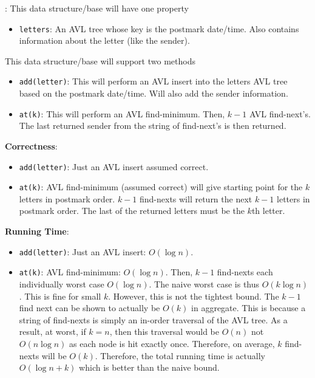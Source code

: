 \documentclass[12pt,twoside]{article}
\begin{document}
\begin{problems}
\begin{problemparts}
: This data structure/base will have one property
    \begin{itemize}
        \item {\tt letters}: An AVL tree whose key is the postmark date/time.
        Also contains information about the letter (like the sender).
    \end{itemize}
    This data structure/base will support two methods
    \begin{itemize}
        \item {\tt add(letter)}: This will perform an AVL insert into the
        letters AVL tree based on the postmark date/time. Will also add the
        sender information.
        \item {\tt at(k)}: This will perform an AVL find-minimum. Then, $k -
        1$ AVL find-next's. The last returned sender from the string of
        find-next's is then returned.
    \end{itemize}

    \smallbreak

    {\bf Correctness}: \begin{itemize}
        \item {\tt add(letter)}: Just an AVL insert assumed correct.
        \item {\tt at(k)}: AVL find-minimum (assumed correct) will give
        starting point for the $ k $ letters in postmark order. $ k - 1 $
        find-nexts will return the next $ k - 1 $ letters in postmark order.
        The last of the returned letters must be the $ k $th letter.
    \end{itemize}

    \smallbreak

    {\bf Running Time}: \begin{itemize}
        \item {\tt add(letter)}: Just an AVL insert: $ O(\log n) $.
        \item {\tt at(k)}: AVL find-minimum: $ O(\log n) $. Then, $ k - 1 $
        find-nexts each individually worst case $ O(\log n) $. The naive
        worst case is thus $ O(k \log n) $. This is fine for small $ k $.
        However, this is not the tightest bound. The $k - 1$ find next can be
        shown to actually be $ O(k) $ in aggregate. This is because a string
        of find-nexts is simply an in-order traversal of the AVL tree. As a
        result, at worst, if $ k = n $, then this traversal would be $ O(n) $
        not $ O(n \log n) $ as each node is hit exactly once. Therefore, on
        average, $ k $ find-nexts will be $ O(k) $. Therefore, the total
        running time is actually $ O(\log n + k) $ which is better than the
        naive bound.
    \end{itemize}


\end{problemparts}
\end{problems}
\end{document}

